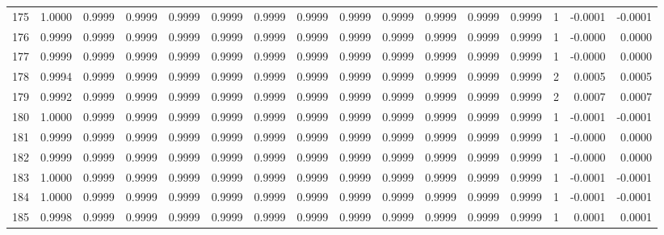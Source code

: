\begin{tabular}{lrrrrrrrrrrrrrrr}
175 &      1.0000 &  0.9999 &  0.9999 &  0.9999 &  0.9999 &  0.9999 &  0.9999 &  0.9999 &  0.9999 &  0.9999 &   0.9999 &     0.9999 &      1 &                   -0.0001 &                    -0.0001 \\
176 &      0.9999 &  0.9999 &  0.9999 &  0.9999 &  0.9999 &  0.9999 &  0.9999 &  0.9999 &  0.9999 &  0.9999 &   0.9999 &     0.9999 &      1 &                   -0.0000 &                     0.0000 \\
177 &      0.9999 &  0.9999 &  0.9999 &  0.9999 &  0.9999 &  0.9999 &  0.9999 &  0.9999 &  0.9999 &  0.9999 &   0.9999 &     0.9999 &      1 &                   -0.0000 &                     0.0000 \\
178 &      0.9994 &  0.9999 &  0.9999 &  0.9999 &  0.9999 &  0.9999 &  0.9999 &  0.9999 &  0.9999 &  0.9999 &   0.9999 &     0.9999 &      2 &                    0.0005 &                     0.0005 \\
179 &      0.9992 &  0.9999 &  0.9999 &  0.9999 &  0.9999 &  0.9999 &  0.9999 &  0.9999 &  0.9999 &  0.9999 &   0.9999 &     0.9999 &      2 &                    0.0007 &                     0.0007 \\
180 &      1.0000 &  0.9999 &  0.9999 &  0.9999 &  0.9999 &  0.9999 &  0.9999 &  0.9999 &  0.9999 &  0.9999 &   0.9999 &     0.9999 &      1 &                   -0.0001 &                    -0.0001 \\
181 &      0.9999 &  0.9999 &  0.9999 &  0.9999 &  0.9999 &  0.9999 &  0.9999 &  0.9999 &  0.9999 &  0.9999 &   0.9999 &     0.9999 &      1 &                   -0.0000 &                     0.0000 \\
182 &      0.9999 &  0.9999 &  0.9999 &  0.9999 &  0.9999 &  0.9999 &  0.9999 &  0.9999 &  0.9999 &  0.9999 &   0.9999 &     0.9999 &      1 &                   -0.0000 &                     0.0000 \\
183 &      1.0000 &  0.9999 &  0.9999 &  0.9999 &  0.9999 &  0.9999 &  0.9999 &  0.9999 &  0.9999 &  0.9999 &   0.9999 &     0.9999 &      1 &                   -0.0001 &                    -0.0001 \\
184 &      1.0000 &  0.9999 &  0.9999 &  0.9999 &  0.9999 &  0.9999 &  0.9999 &  0.9999 &  0.9999 &  0.9999 &   0.9999 &     0.9999 &      1 &                   -0.0001 &                    -0.0001 \\
185 &      0.9998 &  0.9999 &  0.9999 &  0.9999 &  0.9999 &  0.9999 &  0.9999 &  0.9999 &  0.9999 &  0.9999 &   0.9999 &     0.9999 &      1 &                    0.0001 &                     0.0001 \\

\end{tabular}

